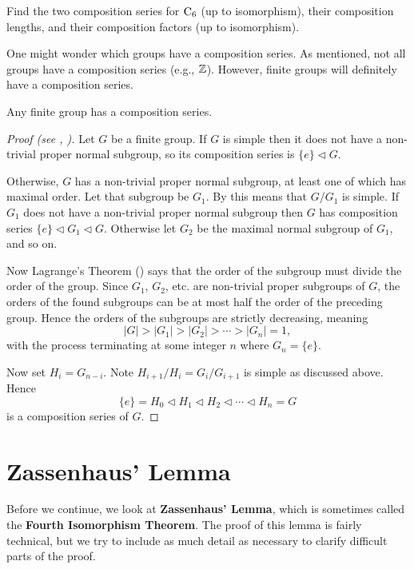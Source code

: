 \begin{exercise}
    Find the two composition series for $\mathrm{C}_{6}$ (up to isomorphism), their composition lengths, and their composition factors (up to isomorphism).
\end{exercise}

One might wonder which groups have a composition series. As mentioned, not all groups have a composition series (e.g., $\mathbb{Z}$). However, finite groups will definitely have a composition series.
\begin{theorem}\label{thrm-finite-group-has-composition-series}
    Any finite group has a composition series.
\end{theorem}
\begin{proof}[Proof (see {\cite[Theorem I.8.4]{hungerford_1980}}, \cite{proofwiki_finite-group-has-composition-series})]
    Let $G$ be a finite group. If $G$ is simple then it does not have a non-trivial proper normal subgroup, so its composition series is $\{e\} \lhd G$.
    
    Otherwise, $G$ has a non-trivial proper normal subgroup, at least one of which has maximal order. Let that subgroup be $G_1$. By  this means that $G/G_1$ is simple. If $G_1$ does not have a non-trivial proper normal subgroup then $G$ has composition series $\{e\} \lhd G_1 \lhd G$. Otherwise let $G_2$ be the maximal normal subgroup of $G_1$, and so on. 
    
    Now Lagrange's Theorem () says that the order of the subgroup must divide the order of the group. Since $G_1$, $G_2$, etc. are non-trivial proper subgroups of $G$, the orders of the found subgroups can be at most half the order of the preceding group. Hence the orders of the subgroups are strictly decreasing, meaning
    \[
        |G| > |G_1| > |G_2| > \cdots > |G_n| = 1,
    \]
    with the process terminating at some integer $n$ where $G_n = \{e\}$.

    Now set $H_i = G_{n-i}$. Note $H_{i+1}/H_i = G_i/G_{i+1}$ is simple as discussed above. Hence
    \[
        \{e\} = H_0 \lhd H_1 \lhd H_2 \lhd \cdots \lhd H_n = G    
    \]
    is a composition series of $G$.
\end{proof}

\section{Zassenhaus' Lemma}
Before we continue, we look at \textbf{Zassenhaus' Lemma}, which is sometimes called the \textbf{Fourth Isomorphism Theorem}. The proof of this lemma is fairly technical, but we try to include as much detail as necessary to clarify difficult parts of the proof.


